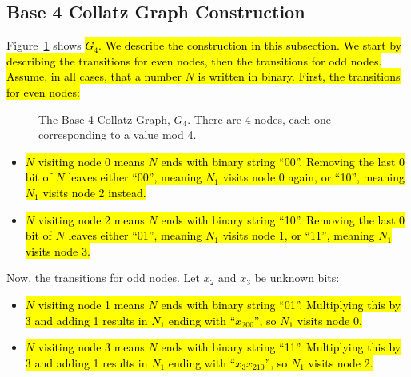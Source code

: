  \subsection{Base 4 Collatz Graph Construction} \label{subsubsec:proofbase4graph}
Figure~\ref{fig:base_4_graph} shows \hl{$G_4$. We describe the construction in this subsection. We start by describing the transitions for even nodes, then the transitions for odd nodes. Assume, in all cases, that a number $N$ is written in binary. First, the transitions for even nodes:}
\begin{figure}
    \centering
    \caption{The Base 4 Collatz Graph, $G_4$. There are 4 nodes, each one corresponding to a value mod 4.}
    \label{fig:base_4_graph}
\end{figure}

\begin{itemize}
    \item \hl{$N$ visiting node 0 means $N$ ends with binary string ``00''. Removing the last 0 bit of $N$ leaves either ``00'', meaning $N_1$ visits node 0 again, or ``10'', meaning $N_1$ visits node 2 instead.} 
    \item \hl{$N$ visiting node 2 means $N$ ends with binary string ``10''. Removing the last 0 bit of $N$ leaves either ``01'', meaning $N_1$ visits node 1, or ``11'', meaning $N_1$ visits node 3.}
\end{itemize}
Now, the transitions for odd nodes. Let $x_2$ and $x_3$ be unknown bits:
\begin{itemize}
    \item \hl{$N$ visiting node 1 means $N$ ends with binary string ``01''.  Multiplying this by 3 and adding 1 results in $N_1$ ending with ``$x_200$'', so $N_1$ visits node 0.}
    \item \hl{$N$ visiting node 3 means $N$ ends with binary string ``11''.  Multiplying this by 3 and adding 1 results in $N_1$ ending with ``$x_3x_210$'', so $N_1$ visits node 2.}
\end{itemize}
